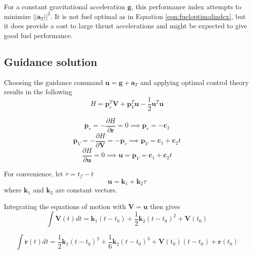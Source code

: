 For a constant gravitational acceleration $\boldsymbol{g}$, this performance index attempts to minimize $||\boldsymbol{a}_T||^2$. It is not fuel optimal as in Equation \ref{eqn:fueloptimalindex}, but it does provide a cost to large thrust accelerations and might be expected to give good fuel performance.

\subsection{Guidance solution}
Choosing the guidance command $\boldsymbol{u} = \boldsymbol{g} + \boldsymbol{a}_T$ and applying optimal control theory results in the following
\begin{equation}
\label{eqn:Hamiltonian}
H = \boldsymbol{p}_r^T\boldsymbol{V} + \boldsymbol{p}_V^T\boldsymbol{u} - \frac{1}{2}\boldsymbol{u}^T\boldsymbol{u}
\end{equation}

\begin{equation*}
\dot{\boldsymbol{p}}_r = -\frac{\partial H}{\partial \boldsymbol{r}} = 0 \implies \boldsymbol{p}_r = -\boldsymbol{c}_2
\end{equation*}
\begin{equation*}
\dot{\boldsymbol{p}}_V = -\frac{\partial H}{\partial \boldsymbol{V}} = -\boldsymbol{p}_r \implies \boldsymbol{p}_V = \boldsymbol{c}_1 + \boldsymbol{c}_2 t
\end{equation*}
\begin{equation*}
\frac{\partial H}{\partial \boldsymbol{u}} = 0 \implies \boldsymbol{u} = \boldsymbol{p}_V = \boldsymbol{c}_1 + \boldsymbol{c}_2 t
\end{equation*}

For convenience, let $\tau = t_f - t$
\begin{equation}
\label{eqn:command}
\boldsymbol{u} = \boldsymbol{k}_1 + \boldsymbol{k}_2 \tau
\end{equation}
where $\boldsymbol{k}_1$ and $\boldsymbol{k}_2$ are constant vectors.

Integrating the equations of motion with $\boldsymbol{\dot{V}} = \boldsymbol{u}$ then gives
\begin{equation}
\label{eqn:EoM_solve_1}
\int\boldsymbol{\dot{V}}(t) dt  = \boldsymbol{k}_1(t-t_0) + \frac{1}{2}\boldsymbol{k}_2(t-t_0)^2 + \boldsymbol{V}(t_0) 
\end{equation}

\begin{equation}
\int \boldsymbol{\dot{r}}(t)dt = \frac{1}{2} \boldsymbol{k}_1(t-t_0)^2 + \frac{1}{6}\boldsymbol{k}_2(t-t_0)^3 + \boldsymbol{V}(t_0)(t-t_0) + \boldsymbol{r}(t_0) 
\label{eqn:EoM_solve_2}
\end{equation}

